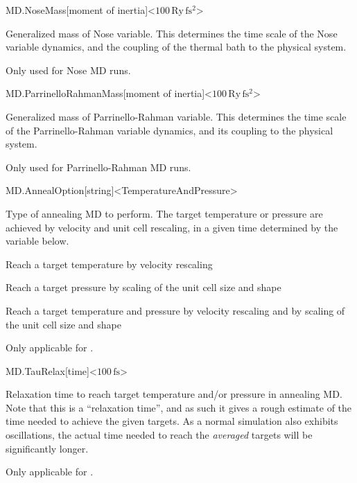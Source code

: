 \begin{fdfentry}{MD.NoseMass}[moment of inertia]<$100\,\mathrm{Ry\,fs^2}$>
  
  Generalized mass of Nose variable.  This determines the time scale
  of the Nose variable dynamics, and the coupling of the thermal bath
  to the physical system.

  Only used for Nose MD runs.

\end{fdfentry}

\begin{fdfentry}{MD.ParrinelloRahmanMass}[moment of inertia]<$100\,\mathrm{Ry\,fs^2}$>

  Generalized mass of Parrinello-Rahman variable.  This determines the
  time scale of the Parrinello-Rahman variable dynamics, and its
  coupling to the physical system.

  Only used for Parrinello-Rahman MD runs.

\end{fdfentry}

\begin{fdfentry}{MD.AnnealOption}[string]<TemperatureAndPressure>
  
  Type of annealing MD to perform. The target temperature or pressure
  are achieved by velocity and unit cell rescaling, in a given time
  determined by the variable  below.
  \begin{fdfoptions}
    \option[Temperature]%
    Reach a target temperature by velocity rescaling

    \option[Pressure]%
    Reach a target pressure by scaling of the unit cell size and shape

    \option[TemperatureandPressure]%
    Reach a target temperature and pressure by velocity rescaling and
    by scaling of the unit cell size and shape
  \end{fdfoptions}

  Only applicable for .

\end{fdfentry}

\begin{fdfentry}{MD.TauRelax}[time]<$100\,\mathrm{fs}$>
  
  Relaxation time to reach target temperature and/or pressure in
  annealing MD. Note that this is a ``relaxation time'', and as such
  it gives a rough estimate of the time needed to achieve the given
  targets. As a normal simulation also exhibits oscillations, the
  actual time needed to reach the \emph{averaged} targets will be
  significantly longer.

  Only applicable for .

\end{fdfentry}

